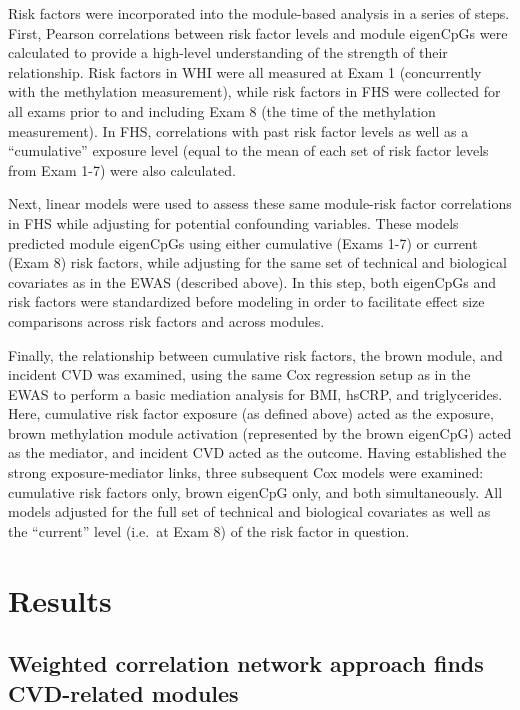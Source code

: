 \documentclass[]{bmcart}
\begin{document}
Risk factors were incorporated into the module-based analysis in a
series of steps. First, Pearson correlations between risk factor levels
and module eigenCpGs were calculated to provide a high-level
understanding of the strength of their relationship. Risk factors in WHI
were all measured at Exam 1 (concurrently with the methylation
measurement), while risk factors in FHS were collected for all exams
prior to and including Exam 8 (the time of the methylation measurement).
In FHS, correlations with past risk factor levels as well as a
``cumulative'' exposure level (equal to the mean of each set of risk
factor levels from Exam 1-7) were also calculated.

Next, linear models were used to assess these same module-risk factor
correlations in FHS while adjusting for potential confounding variables.
These models predicted module eigenCpGs using either cumulative (Exams
1-7) or current (Exam 8) risk factors, while adjusting for the same set
of technical and biological covariates as in the EWAS (described above).
In this step, both eigenCpGs and risk factors were standardized before
modeling in order to facilitate effect size comparisons across risk
factors and across modules.

Finally, the relationship between cumulative risk factors, the brown
module, and incident CVD was examined, using the same Cox regression
setup as in the EWAS to perform a basic mediation analysis for BMI,
hsCRP, and triglycerides. Here, cumulative risk factor exposure (as
defined above) acted as the exposure, brown methylation module
activation (represented by the brown eigenCpG) acted as the mediator,
and incident CVD acted as the outcome. Having established the strong
exposure-mediator links, three subsequent Cox models were examined:
cumulative risk factors only, brown eigenCpG only, and both
simultaneously. All models adjusted for the full set of technical and
biological covariates as well as the ``current'' level (i.e.~at Exam 8)
of the risk factor in question.

\section{Results}\label{results}

\subsection{Weighted correlation network approach finds CVD-related
modules}\label{weighted-correlation-network-approach-finds-cvd-related-modules}
\end{document}
